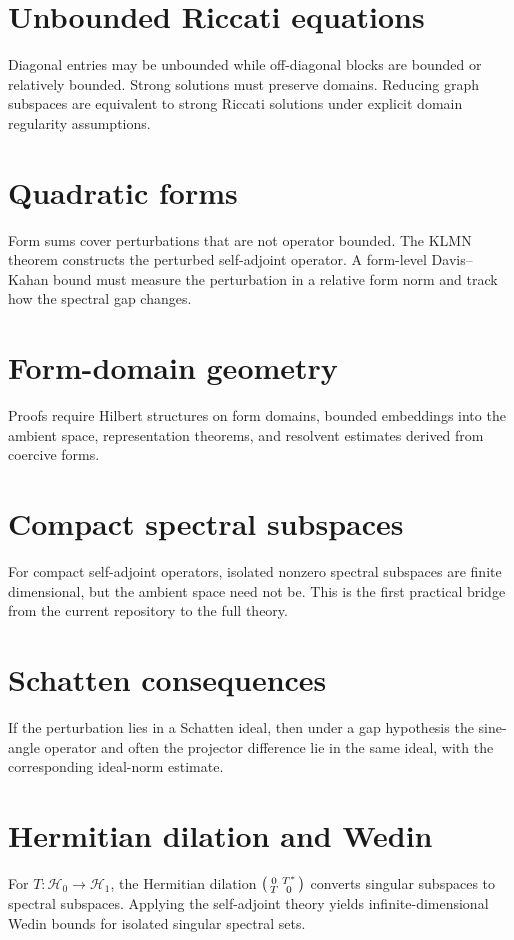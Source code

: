 \documentclass{article}
\newcommand{\Hh}{\mathcal H}
\begin{document}
\section{Unbounded Riccati equations}
Diagonal entries may be unbounded while off-diagonal blocks are bounded or
relatively bounded.  Strong solutions must preserve domains.  Reducing graph
subspaces are equivalent to strong Riccati solutions under explicit domain
regularity assumptions.

\section{Quadratic forms}
Form sums cover perturbations that are not operator bounded.  The KLMN theorem
constructs the perturbed self-adjoint operator.  A form-level Davis--Kahan
bound must measure the perturbation in a relative form norm and track how the
spectral gap changes.

\section{Form-domain geometry}
Proofs require Hilbert structures on form domains, bounded embeddings into the
ambient space, representation theorems, and resolvent estimates derived from
coercive forms.

\section{Compact spectral subspaces}
For compact self-adjoint operators, isolated nonzero spectral subspaces are
finite dimensional, but the ambient space need not be.  This is the first
practical bridge from the current repository to the full theory.

\section{Schatten consequences}
If the perturbation lies in a Schatten ideal, then under a gap hypothesis the
sine-angle operator and often the projector difference lie in the same ideal,
with the corresponding ideal-norm estimate.

\section{Hermitian dilation and Wedin}
For $T:\Hh_0\to\Hh_1$, the Hermitian dilation
$\begin{psmallmatrix}0&T^*\\T&0\end{psmallmatrix}$ converts singular subspaces
to spectral subspaces.  Applying the self-adjoint theory yields
infinite-dimensional Wedin bounds for isolated singular spectral sets.
\end{document}
